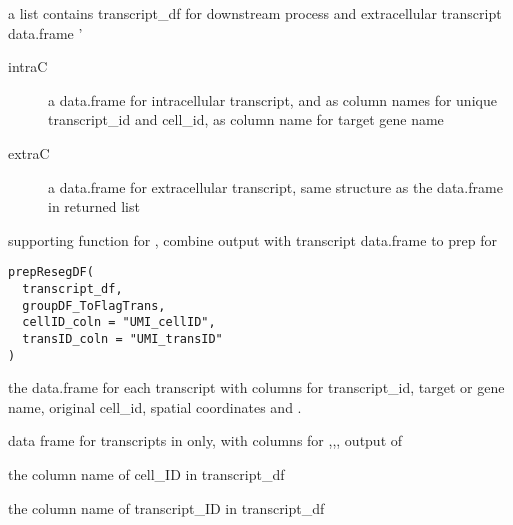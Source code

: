 \documentclass[letterpaper]{book}
\begin{document}
%
\begin{Value}
a list contains transcript\_df for downstream process and extracellular transcript data.frame
' \begin{description}

\item[intraC] a data.frame for intracellular transcript,  and  as column names for unique transcript\_id and cell\_id,  as column name for target gene name
\item[extraC] a data.frame for extracellular transcript, same structure as the  data.frame in returned list

\end{description}

\end{Value}
%
\begin{Description}
supporting function for , combine  output with transcript data.frame to prep for 
\end{Description}
%
\begin{Usage}
\begin{verbatim}
prepResegDF(
  transcript_df,
  groupDF_ToFlagTrans,
  cellID_coln = "UMI_cellID",
  transID_coln = "UMI_transID"
)
\end{verbatim}
\end{Usage}
%
\begin{Arguments}
\begin{ldescription}
\item[\code{transcript\_df}] the data.frame for each transcript with columns for transcript\_id, target or gene name, original cell\_id, spatial coordinates and .

\item[\code{groupDF\_ToFlagTrans}] data frame for transcripts in  only, with columns for ,,, output of 

\item[\code{cellID\_coln}] the column name of cell\_ID in transcript\_df

\item[\code{transID\_coln}] the column name of transcript\_ID in transcript\_df
\end{ldescription}
\end{Arguments}
\end{document}
